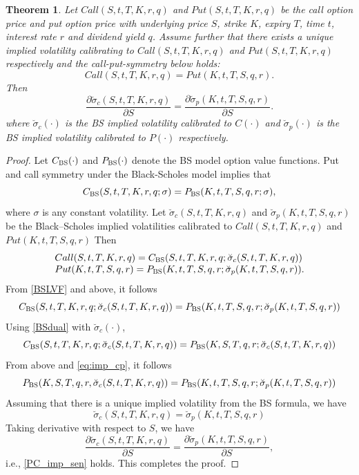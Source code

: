 \documentclass[letterpaper,12pt,titlepage,oneside,final]{book}
\numberwithin{equation}{section}
\newtheorem{thm}{Theorem}[section]
\theoremstyle{definition}
\newcommand{\impsigma}{\breve{\sigma}}
\newcommand{\BS}{\textsc{BS}}
\begin{document}
\begin{thm}\label{pc:symmetry}
Let $Call(S,t,T,K,r,q)$ and $Put(S,t,T,K,r,q)$ be the call option price and put option price with underlying price $S$, strike $K$, expiry $T$, time $t$, interest rate $r$ and dividend yield $q$.
Assume further that there exists a unique implied volatility calibrating to  $Call(S,t,T,K,r,q)$ and $Put(S,t,T,K,r,q)$  respectively and the call-put-symmetry below holds:
\begin{equation} \label{BSLVF}
Call(S, t,T,K,r, q)=Put(K, t,T,S , q, r).
\end{equation}
Then
\begin{equation}\label{PC_imp_sen}
\frac{\partial \impsigma_c(S, t,T,K, r, q)}{\partial S} =\frac{\partial \impsigma_p(K, t,T,S , q, r)}{\partial S}.
\end{equation}
where $\impsigma_c(\cdot)$ is the BS implied volatility calibrated to $C(\cdot)$ and $\impsigma_p(\cdot)$ is the BS implied volatility calibrated to $P(\cdot)$
respectively.
\end{thm}

\begin{proof}
Let $C_{\BS}(\cdot)$ and $P_{\BS}(\cdot)$  denote the BS model option value functions. Put and call symmetry under the Black-Scholes model implies that
\begin{equation}\label{BSdual}
C_{\BS}(S,t,T,K, r, q;\sigma )=P_{\BS}(K,t,T,S, q, r;\sigma),
\end{equation}
where $\sigma$ is any constant volatility.
Let $\impsigma_c(S, t,T,K, r, q)$ and $\impsigma_p(K, t,T,S , q, r)$ be the Black–Scholes implied volatilities calibrated to $Call(S,t,T,K, r, q)$ and $Put(K,t,T,S, q, r)$
Then
\begin{equation}
\begin{array}{l}
    Call(S,t,T,K, r, q)=C_{\BS}(S,t,T,K, r, q;\impsigma_c(S, t,T,K, r, q) )\\
    Put(K,t,T,S, q, r)=P_{\BS}(K,t,T,S, q, r;\impsigma_p(K, t,T,S , q, r)).
\end{array}
\end{equation}
From \eqref{BSLVF} and above, it follows
\begin{equation}\label{eq:imp_cp}
    C_{\BS}(S,t,T,K, r, q;\impsigma_c(S, t,T,K, r, q) )=P_{\BS}(K,t,T,S, q, r;\impsigma_p(K, t,T,S , q, r))
\end{equation}
Using \eqref{BSdual} with $\impsigma_c(\cdot)$,
$$
C_{\BS}(S,t,T,K, r, q;\impsigma_c(S, t,T,K, r, q) )=P_{\BS}(K, S, T, q, r;\impsigma_c(S, t,T,K, r, q))
$$
From above and \eqref{eq:imp_cp}, it follows
$$
P_{\BS}(K, S, T, q, r,\impsigma_c(S, t,T,K, r, q))= P_{\BS}(K,t,T,S, q, r;\impsigma_p(K, t,T,S , q, r))
$$
Assuming that there is a unique implied volatility from the BS formula, we have
\begin{equation}
    \impsigma_c(S, t,T,K, r, q)=\impsigma_p(K, t,T,S , q, r)
\end{equation}
Taking derivative with respect to $S$, we have
$$
\frac{\partial \impsigma_c(S, t,T,K, r, q)}{\partial S} =\frac{\partial \impsigma_p(K, t,T,S , q, r)}{\partial S},
$$
i.e., \eqref{PC_imp_sen} holds.
This completes the proof.
\end{proof}
\end{document}
